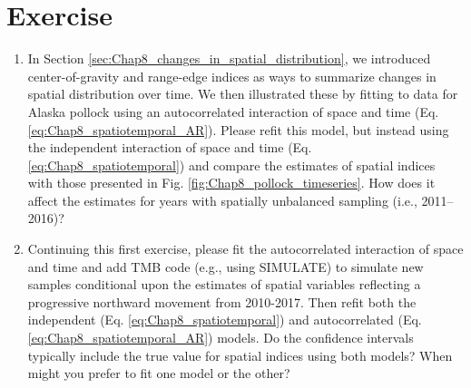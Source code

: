 \section{Exercise}

\begin{enumerate}
    \item In Section \ref{sec:Chap8_changes_in_spatial_distribution}, we introduced center-of-gravity and range-edge indices as ways to summarize changes in spatial distribution over time.  We then illustrated these by fitting to data for Alaska pollock using an autocorrelated interaction of space and time (Eq. \ref{eq:Chap8_spatiotemporal_AR}).  Please refit this model, but instead using the independent interaction of space and time (Eq. \ref{eq:Chap8_spatiotemporal}) and compare the estimates of spatial indices with those presented in Fig. \ref{fig:Chap8_pollock_timeseries}.  How does it affect the estimates for years with spatially unbalanced sampling (i.e., 2011--2016)?

    \item Continuing this first exercise, please fit the autocorrelated interaction of space and time and add TMB code (e.g., using \colorbox{backblue}{SIMULATE}) to simulate new samples conditional upon the estimates of spatial variables reflecting a progressive northward movement from 2010-2017.  Then refit both the independent (Eq. \ref{eq:Chap8_spatiotemporal}) and autocorrelated (Eq. \ref{eq:Chap8_spatiotemporal_AR}) models.  Do the confidence intervals typically include the true value for spatial indices using both models?  When might you prefer to fit one model or the other?   
\end{enumerate}

